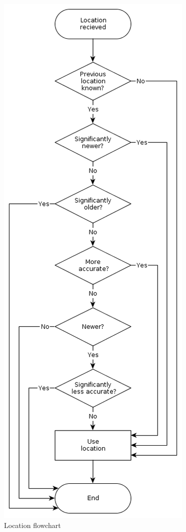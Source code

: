 \begin{figure}[H]
  \centering
   \includegraphics[height=0.9\textheight]{Images/diagrams/location.png}
  \caption{Location flowchart}
  \label{fig:location}
\end{figure}


